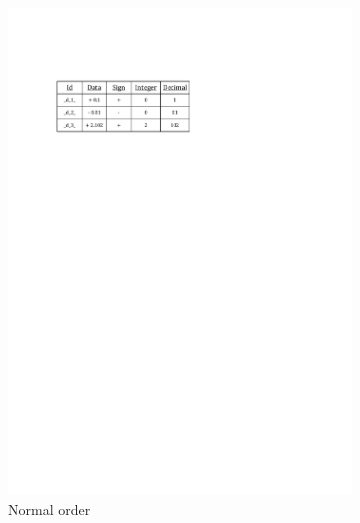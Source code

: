 \begin{figure}[h]
\centering
    \begin{subfigure}[b]{0.4\textwidth}
        \includegraphics[width=\textwidth]{./algorithm/real/pic/design/data_store_inverted_1_v1.pdf}
        \caption{Normal order}
        \label{fig:algorithm:real:data_store_inverted_1}
    \end{subfigure}%
    ~ %
    \begin{subfigure}[b]{0.4\textwidth}

\end{subfigure}
\end{figure}
